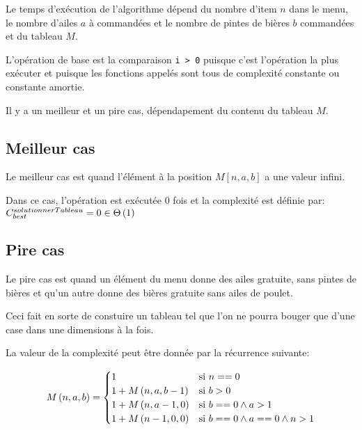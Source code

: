 \documentclass[class=article]{standalone}
\begin{document}
Le temps d'exécution de l'algorithme dépend du nombre d'item $n$ dans le menu,
le nombre d'ailes $a$ à commandées et le nombre de pintes de bières $b$ commandées
et du tableau $M$.

L'opération de base est la comparaison \lstinline{i > 0} puisque c'est l'opération
la plus exécuter et puisque les fonctions appelés sont tous de complexité constante
ou constante amortie. 

Il y a un meilleur et un pire cas, dépendapement du contenu du tableau $M$.

\subsection*{Meilleur cas}

Le meilleur cas est quand l'élément à la position $M[n,a,b]$ a une valeur infini.

Dans ce cas, l'opération est exécutée 0 fois et la complexité est définie par:
$C^{solutionnerTableau}_{best} = 0 \in \Theta\left ( 1 \right )$

\subsection*{Pire cas}

Le pire cas est quand un élément du menu donne des ailes gratuite, sans pintes de bières
et qu'un autre donne des bières gratuite sans ailes de poulet.

Ceci fait en sorte de constuire un tableau tel que l'on ne pourra bouger que d'une case
dans une dimensions à la fois.

La valeur de la complexité peut être donnée par la récurrence suivante:

\[
    M\left ( n, a, b \right ) =
    \begin{cases}
        1 & \text{si } n == 0 \\
        1 + M\left ( n, a, b-1 \right ) & \text{si } b > 0 \\
        1 + M\left ( n, a-1, 0 \right ) & \text{si } b == 0 \wedge a > 1 \\
        1 + M\left ( n-1, 0, 0 \right ) & \text{si } b == 0 \wedge a == 0 \wedge n > 1 \\
    \end{cases}
\]
\end{document}

